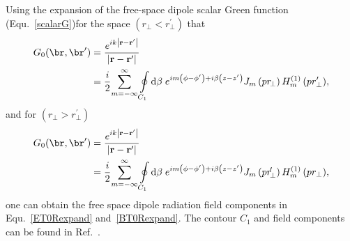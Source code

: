 \documentclass[]{report}
\begin{document}
Using the expansion of the free-space dipole scalar Green function (Equ.~\eqref{scalarG})for the space $ \left(r\!_\perp <r_\perp ^{\prime}\right) $ that 
\begin{align}
G_0(\br,\br') &={\frac{{e^{ik{\left| {{\rm {\bf r}}-{\rm {\bf {r}^{\prime }}}}\right| }}}}{{{%
\left| {{\rm {\bf r}}-{\rm {\bf {r}^{\prime }}}}\right| }}}}\nonumber\\
&={\frac{{i}}{{2}}%
}{\sum\limits_{m=-\infty }^{\infty } {{\oint\limits_{C_{1}}{\mathrm{d}\beta \;e^{im\left( {\phi -{\phi }%
^{\prime }}\right) +i\beta \left( {z-{z}^{\prime }}\right) }J_{m}\left( {pr\!_\perp
}\right) H_{m}^{\left( {1}\right) }\left( pr_\perp ^{\prime
}\right) }}}},
\end{align}
and for $ \left(r\!_\perp >r_\perp ^{\prime}\right) $
\begin{align}
G_0(\br,\br') &={\frac{{e^{ik{\left| {{\rm {\bf r}}-{\rm {\bf {r}^{\prime }}}}\right| }}}}{{{%
\left| {{\rm {\bf r}}-{\rm {\bf {r}^{\prime }}}}\right| }}}}\nonumber\\
&={\frac{{i}}{{2}}%
}{\sum\limits_{m=-\infty }^{\infty } {{\oint\limits_{C_{1}}{\mathrm{d}\beta \;e^{im\left( {\phi -{\phi }%
^{\prime }}\right) +i\beta \left( {z-{z}^{\prime }}\right) }J_{m}\left( {pr\!_\perp^{\prime} }\right) H_{m}^{\left( {1}\right) }\left( pr_\perp \right) }}}},
\end{align}
one can obtain the free space dipole radiation field components in Equ.~\eqref{ET0Rexpand} and~\eqref{BT0Rexpand}. The contour $ C_1 $ and field components can be found in Ref.~\cite{Klimov2004}. 
\end{document}
